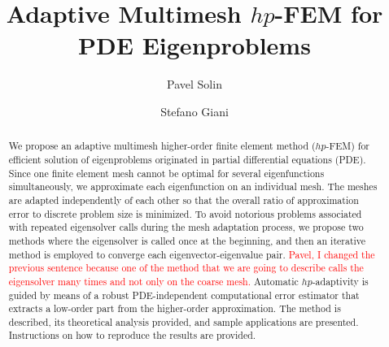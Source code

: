 \documentclass[preprint ,12pt]{elsarticle}
\begin{document}
\begin{frontmatter}



\title{Adaptive Multimesh $hp$-FEM for PDE Eigenproblems}

\author[label1,label2]{Pavel Solin}
\author[label3]{Stefano Giani}
\address[label1]{Department of Mathematics and Statistics, University of Nevada, Reno, USA}
\address[label2]{Institute of Thermomechanics, Academy of Sciences of the Czech Republic, Prague}
\address[label3]{School of Mathematical Sciences, University of Nottingham, United Kingdom}



\begin{abstract}
We propose an adaptive multimesh higher-order finite element method ($hp$-FEM) 
for efficient solution of eigenproblems originated in partial differential 
equations (PDE). Since one finite element mesh cannot be optimal for several
eigenfunctions simultaneously, we approximate each eigenfunction on an individual 
mesh. The meshes are adapted independently of each other so that 
the overall ratio of approximation error to discrete problem size is minimized.
To avoid notorious problems associated with repeated eigensolver calls during the 
mesh adaptation process, we propose two methods where the eigensolver is called once at the beginning, and 
then an iterative method is employed to converge each eigenvector-eigenvalue pair. \textcolor{red}{Pavel, I changed the previous sentence because one of the method that we are going to describe calls the eigensolver many times and not only on the coarse mesh.}
Automatic $hp$-adaptivity is guided by means of a robust PDE-independent computational 
error estimator that extracts a low-order part from the higher-order approximation. 
The method is described, its theoretical analysis provided, and sample 
applications are presented. Instructions on how to reproduce the results 
are provided. 
\end{abstract}


\end{frontmatter}
\end{document}
